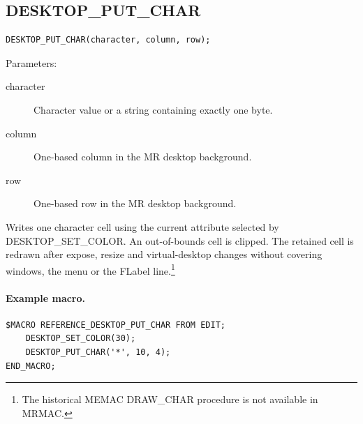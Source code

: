 \documentclass[a4paper,10pt,twoside,openany]{book}
\newenvironment{mrmacextension}{\begin{changebar}}{\end{changebar}}
\begin{document}
\begin{mrmacextension}
\label{prim:procedure-desktop-put-char}
\subsection*{DESKTOP\_PUT\_CHAR}
\begin{verbatim}
DESKTOP_PUT_CHAR(character, column, row);
\end{verbatim}
Parameters:
\begin{description}
\item[character] Character value or a string containing exactly one byte.
\item[column] One-based column in the MR desktop background.
\item[row] One-based row in the MR desktop background.
\end{description}

Writes one character cell using the current attribute selected by
DESKTOP\_SET\_COLOR. An out-of-bounds cell is clipped. The retained
cell is redrawn after expose, resize and virtual-desktop changes without
covering windows, the menu or the FLabel line.\footnote{The historical MEMAC
DRAW\_CHAR procedure is not available in MRMAC.}

\paragraph{Example macro.}
\begin{verbatim}
$MACRO REFERENCE_DESKTOP_PUT_CHAR FROM EDIT;
    DESKTOP_SET_COLOR(30);
    DESKTOP_PUT_CHAR('*', 10, 4);
END_MACRO;
\end{verbatim}
\end{mrmacextension}
\end{document}
